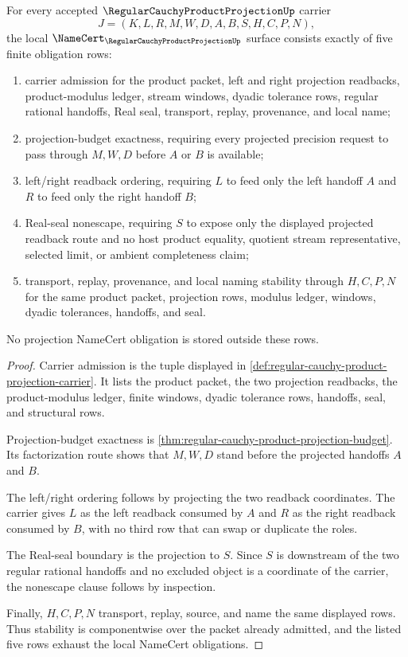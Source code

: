 \begin{theorem}\label{thm:regular-cauchy-product-projection-namecert-obligations}
For every accepted $\RegularCauchyProductProjectionUp$ carrier
$$
J=(K,L,R,M,W,D,A,B,S,H,C,P,N),
$$
the local $\NameCert_{\RegularCauchyProductProjectionUp}$ surface consists exactly of five finite obligation rows:
\begin{enumerate}
\item carrier admission for the product packet, left and right projection readbacks, product-modulus ledger, stream windows, dyadic tolerance rows, regular rational handoffs, Real seal, transport, replay, provenance, and local name;
\item projection-budget exactness, requiring every projected precision request to pass through $M,W,D$ before $A$ or $B$ is available;
\item left/right readback ordering, requiring $L$ to feed only the left handoff $A$ and $R$ to feed only the right handoff $B$;
\item Real-seal nonescape, requiring $S$ to expose only the displayed projected readback route and no host product equality, quotient stream representative, selected limit, or ambient completeness claim;
\item transport, replay, provenance, and local naming stability through $H,C,P,N$ for the same product packet, projection rows, modulus ledger, windows, dyadic tolerances, handoffs, and seal.
\end{enumerate}
No projection NameCert obligation is stored outside these rows.
\end{theorem}
\begin{proof}
Carrier admission is the tuple displayed in \autoref{def:regular-cauchy-product-projection-carrier}. It lists the product packet, the two projection readbacks, the product-modulus ledger, finite windows, dyadic tolerance rows, handoffs, seal, and structural rows.

Projection-budget exactness is \autoref{thm:regular-cauchy-product-projection-budget}. Its factorization route shows that $M,W,D$ stand before the projected handoffs $A$ and $B$.

The left/right ordering follows by projecting the two readback coordinates. The carrier gives $L$ as the left readback consumed by $A$ and $R$ as the right readback consumed by $B$, with no third row that can swap or duplicate the roles.

The Real-seal boundary is the projection to $S$. Since $S$ is downstream of the two regular rational handoffs and no excluded object is a coordinate of the carrier, the nonescape clause follows by inspection.

Finally, $H,C,P,N$ transport, replay, source, and name the same displayed rows. Thus stability is componentwise over the packet already admitted, and the listed five rows exhaust the local NameCert obligations.
\end{proof}

